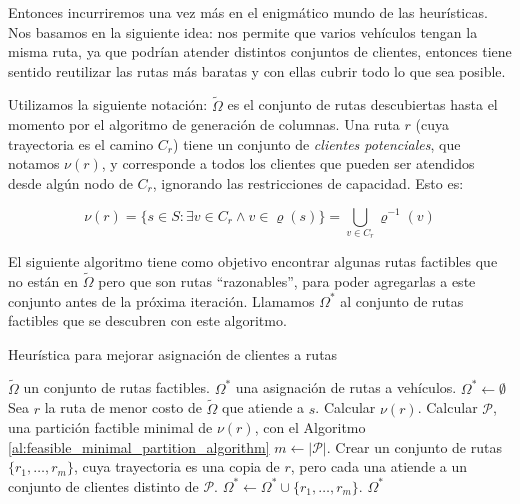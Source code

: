 Entonces incurriremos una vez más en el enigmático mundo de las heurísticas. Nos basamos en la siguiente idea:  nos permite que varios vehículos tengan la misma ruta, ya que podrían atender distintos conjuntos de clientes, entonces tiene sentido reutilizar las rutas más baratas y con ellas cubrir todo lo que sea posible. 

Utilizamos la siguiente notación: $\tilde{\Omega}$ es el conjunto de rutas descubiertas hasta el momento por el algoritmo de generación de columnas. Una ruta $r$ (cuya trayectoria es el camino $C_r$) tiene un conjunto de \emph{clientes potenciales}, que notamos $\nu(r)$, y corresponde a todos los clientes que pueden ser atendidos desde algún nodo de $C_r$, ignorando las restricciones de capacidad. Esto es:

\begin{equation}
    \nu(r) = \{s \in S : \exists v \in C_r \wedge v \in \varrho(s)\} = \bigcup_{v \in C_r}{\varrho^{-1}(v)}
\end{equation}

El siguiente algoritmo tiene como objetivo encontrar algunas rutas factibles que no están en $\tilde{\Omega}$ pero que son rutas ``razonables'', para poder agregarlas a este conjunto antes de la próxima iteración. Llamamos $\Omega^{*}$ al conjunto de rutas factibles que se descubren con este algoritmo.

\begin{algorithm}[H]
  \caption{Heurística para mejorar asignación de clientes a rutas}
  \label{al:2-step-cg-main}
  \begin{algorithmic}[1]
  	\Require $\tilde{\Omega}$ un conjunto de rutas factibles.
  	\Ensure $\Omega^{*}$ una asignación de rutas a vehículos. 
        \State $\Omega^{*} \gets \emptyset$
                \State Sea $r$ la ruta de menor costo de $\tilde{\Omega}$ que atiende a $s$.
                \State Calcular $\nu(r)$.
                \State Calcular $\mathscr{P}$, una partición factible minimal de $\nu(r)$, con el Algoritmo \ref{al:feasible_minimal_partition_algorithm}
                \State $m \gets |\mathscr{P}|$.
                \State Crear un conjunto de rutas $\{r_1, \dots, r_m\}$, cuya trayectoria es una copia de $r$, pero cada una atiende a un conjunto de clientes distinto de $\mathscr{P}$.
                \State $\Omega^{*} \gets \Omega^{*} \cup \{r_1, \dots, r_m\}$.
            \EndIf
        \EndFor
	\Return $\Omega^{*}$
  \end{algorithmic}
\end{algorithm}

